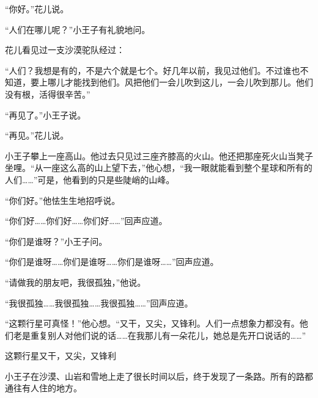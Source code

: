 “你好。”花儿说。

“人们在哪儿呢？”小王子有礼貌地问。

花儿看见过一支沙漠驼队经过：

“人们？我想是有的，不是六个就是七个。好几年以前，我见过他们。不过谁也不知道，要上哪儿才能找到他们。风把他们一会儿吹到这儿，一会儿吹到那儿。他们没有根，活得很辛苦。”

“再见了。”小王子说。

“再见。”花儿说。

{\startalignment[center]
 \stopalignment}


\stoptitle

\starttitle[title={19},reference={part0021.html_a022}]

小王子攀上一座高山。他过去只见过三座齐膝高的火山。他还把那座死火山当凳子坐哩。“从一座这么高的山上望下去，”他心想，“我一眼就能看到整个星球和所有的人们\ldots{}\ldots{}”可是，他看到的只是些陡峭的山峰。

“你们好。”他怯生生地招呼说。

“你们好\ldots{}\ldots{}你们好\ldots{}\ldots{}你们好\ldots{}\ldots{}”回声应道。

“你们是谁呀？”小王子问。

“你们是谁呀\ldots{}\ldots{}你们是谁呀\ldots{}\ldots{}你们是谁呀\ldots{}\ldots{}”回声应道。

“请做我的朋友吧，我很孤独，”他说。

“我很孤独\ldots{}\ldots{}我很孤独\ldots{}\ldots{}我很孤独\ldots{}\ldots{}”回声应道。

“这颗行星可真怪！”他心想。“又干，又尖，又锋利。人们一点想象力都没有。他们老是重复别人对他们说的话\ldots{}\ldots{}在我那儿有一朵花儿，她总是先开口说话的\ldots{}\ldots{}”

{\startalignment[center]
 \stopalignment}

这颗行星又干，又尖，又锋利


\stoptitle

\starttitle[title={20},reference={part0022.html_a023}]

小王子在沙漠、山岩和雪地上走了很长时间以后，终于发现了一条路。所有的路都通往有人住的地方。

